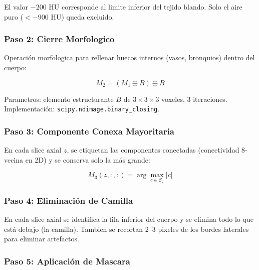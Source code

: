 \documentclass[12pt,a4paper]{article}
\begin{document}
El valor $-200$ HU corresponde al limite inferior del tejido blando.
Solo el aire puro ($<-900$ HU) queda excluido.

\subsubsection{Paso 2: Cierre Morfologico}

Operación morfologica para rellenar huecos internos (vasos, bronquios) dentro del cuerpo:

\begin{equation}\label{eq:cierre}
    M_2 = (M_1 \oplus B) \ominus B
\end{equation}

Parametros: elemento estructurante $B$ de $3 \times 3 \times 3$ voxeles, 3 iteraciones.
Implementación: \texttt{scipy.ndimage.binary\_closing}.

\subsubsection{Paso 3: Componente Conexa Mayoritaria}

En cada slice axial $z$, se etiquetan las componentes conectadas (conectividad 8-vecina en 2D)
y se conserva solo la más grande:

\begin{equation}\label{eq:comp_conexa}
    M_3(z,:,:) = \arg\max_{c \in \mathcal{C}_z} |c|
\end{equation}

\subsubsection{Paso 4: Eliminación de Camilla}

En cada slice axial se identifica la fila inferior del cuerpo y se elimina todo lo que está
debajo (la camilla). Tambien se recortan 2--3 pixeles de los bordes laterales para eliminar
artefactos.

\subsubsection{Paso 5: Aplicación de Mascara}
\end{document}
